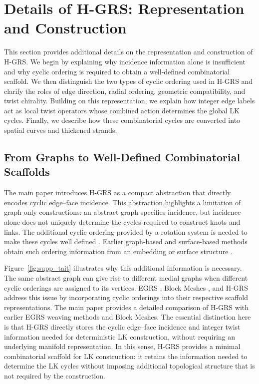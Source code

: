 \documentclass[acmtog]{acmart}
\begin{document}
\section{Details of H-GRS: Representation and Construction}

This section provides additional details on the representation and construction of H-GRS. We begin by explaining why incidence information alone is insufficient and why cyclic ordering is required to obtain a well-defined combinatorial scaffold. We then distinguish the two types of cyclic ordering used in H-GRS and clarify the roles of edge direction, radial ordering, geometric compatibility, and twist chirality. Building on this representation, we explain how integer edge labels act as local twist operators whose combined action determines the global LK cycles. Finally, we describe how these combinatorial cycles are converted into spatial curves and thickened strands.

\subsection{From Graphs to Well-Defined Combinatorial Scaffolds}
\label{sec:rotation-necessity}

The main paper introduces H-GRS as a compact abstraction that directly
encodes cyclic edge--face incidence. This abstraction highlights a limitation
of graph-only constructions: an abstract graph specifies incidence, but
incidence alone does not uniquely determine the cycles required to construct
knots and links. The additional cyclic ordering provided by a rotation system
is needed to make these cycles well defined
\cite{edmonds1960combinatorial,gross2001topological}. Earlier graph-based and
surface-based methods obtain such ordering information from an embedding or
surface structure
\cite{akleman1999guaranteeing,akleman2009cyclic,akleman2015extended}.

Figure~\ref{fig:supp_tait} illustrates why this additional information is
necessary. The same abstract graph can give rise to different medial graphs
when different cyclic orderings are assigned to its vertices. EGRS \cite{akleman2009cyclic,akleman2015extended,akleman2020topologically}, Block
Meshes \cite{akleman2015blockmeshes}, and H-GRS address this issue by incorporating cyclic orderings into
their respective scaffold representations. The main paper provides a detailed
comparison of H-GRS with earlier EGRS weaving methods and Block Meshes. The
essential distinction here is that H-GRS directly stores the cyclic
edge--face incidence and integer twist information needed for deterministic
LK construction, without requiring an underlying manifold representation.
In this sense, H-GRS provides a minimal combinatorial scaffold for LK
construction: it retains the information needed to determine the LK cycles
without imposing additional topological structure that is not required by
the construction.
\end{document}

